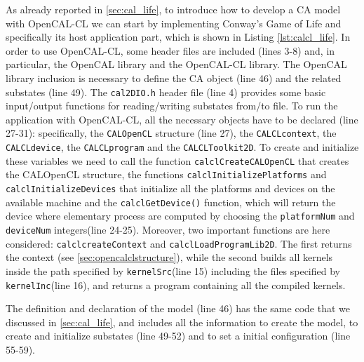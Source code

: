 As already reported in \ref{sec:cal_life}, to introduce how to develop
a CA model with OpenCAL-CL we can start by implementing Conway’s Game
of Life and specifically its host application part, which is shown in
Listing \ref{lst:calcl_life}. In order to use OpenCAL-CL, some header
files are included (lines 3-8) and, in particular, the OpenCAL library
and the OpenCAL-CL library. The OpenCAL library inclusion is necessary
to define the CA object (line 46) and the related substates (line
49). The \verb'cal2DIO.h' header file (line 4) provides some basic
input/output functions for reading/writing substates from/to file. To
run the application with OpenCAL-CL, all the necessary objects have to
be declared (line 27-31): specifically, the \verb'CALOpenCL' structure
(line 27), the \verb'CALCLcontext', the \verb'CALCLdevice', the
\verb'CALCLprogram' and the \verb'CALCLToolkit2D'. To create and
initialize these variables we need to call the function
\verb'calclCreateCALOpenCL' that creates the CALOpenCL structure, the
functions \verb|calclInitializePlatforms| and
\verb|calclInitializeDevices| that initialize all the platforms and
devices on the available machine and the \verb'calclGetDevice()'
function, which will return the device where elementary process are
computed by choosing the \verb'platformNum' and \verb'deviceNum'
integers(line 24-25). Moreover, two important functions are here
considered: \verb'calclcreateContext' and
\verb'calclLoadProgramLib2D'. The first returns the context
(see \ref{sec:opencalclstructure}), while the second builds all kernels inside
the path specified by \verb'kernelSrc'(line 15) including the files
specified by \verb'kernelInc'(line 16), and returns a program
containing all the compiled kernels.

The definition and declaration of the model (line 46) has the same code
that we discussed in \ref{sec:cal_life}, and includes all the information
to create the model, to create and initialize substates (line 49-52) and 
to set a initial configuration (line 55-59).


	
